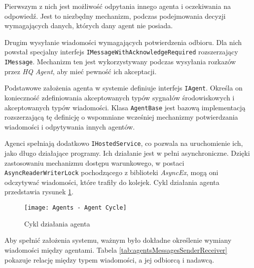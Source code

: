 \par Pierwszym z nich jest możliwość odpytania innego agenta i oczekiwania na odpowiedź. Jest to niezbędny mechanizm, podczas podejmowania decyzji wymagających danych, których dany agent nie posiada.

\par Drugim wysyłanie wiadomości wymagających potwierdzenia odbioru. Dla nich powstał specjalny interfejs \texttt{IMessageWithAcknowledgeRequired} rozszerzający \texttt{IMessage}. Mechanizm ten jest wykorzystywany podczas wysyłania rozkazów przez \emph{HQ Agent}, aby mieć pewność ich akceptacji.

\par Podstawowe założenia agenta w systemie definiuje interfejs \texttt{IAgent}. Określa on konieczność zdefiniowania akceptowanych typów sygnałów środowiskowych i akceptowanych typów wiadomości. Klasa \texttt{AgentBase} jest bazową implementacją rozszerzającą tę definicję o wspomniane wcześniej mechanizmy potwierdzania wiadomości i odpytywania innych agentów.

\par Agenci spełniają dodatkowo \texttt{IHostedService}, co pozwala na uruchomienie ich, jako długo działające programy\cite{BACKGROUND_TASKS_WITH_HOSTED_SERVICES}. Ich działanie jest w pełni asynchroniczne. Dzięki zastosowaniu mechanizmu dostępu warunkowego, w postaci \texttt{AsyncReaderWriterLock} pochodzącego z biblioteki \emph{AsyncEx}\cite{STEPHEN_CLEARY_ASYNCEX_GITHUB}, mogą oni odczytywać wiadomości, które trafiły do kolejek. Cykl działania agenta przedstawia rysunek \ref{fig:agentsAgentCycle}.

\begin{figure}
    \centering
    \texttt{[image: Agents - Agent Cycle]}
    \caption{Cykl działania agenta}
    \label{fig:agentsAgentCycle}
\end{figure}

\par Aby spełnić założenia systemu, ważnym było dokładne określenie wymiany wiadomości między agentami. Tabela \ref{tab:agentsMessagesSenderReceiver} pokazuje relację między typem wiadomości, a jej odbiorcą i nadawcą.

